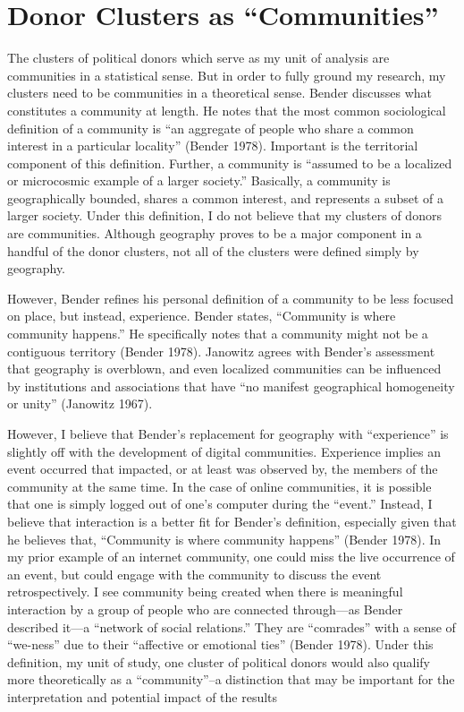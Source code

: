 \documentclass[12pt,]{article}
\begin{document}
\hypertarget{donor-clusters-as-communities}{%
\section{Donor Clusters as
``Communities''}\label{donor-clusters-as-communities}}

The clusters of political donors which serve as my unit of analysis are
communities in a statistical sense. But in order to fully ground my
research, my clusters need to be communities in a theoretical sense.
Bender discusses what constitutes a community at length. He notes that
the most common sociological definition of a community is ``an aggregate
of people who share a common interest in a particular locality'' (Bender
1978). Important is the territorial component of this definition.
Further, a community is ``assumed to be a localized or microcosmic
example of a larger society.'' Basically, a community is geographically
bounded, shares a common interest, and represents a subset of a larger
society. Under this definition, I do not believe that my clusters of
donors are communities. Although geography proves to be a major
component in a handful of the donor clusters, not all of the clusters
were defined simply by geography.

However, Bender refines his personal definition of a community to be
less focused on place, but instead, experience. Bender states,
``Community is where community happens.'' He specifically notes that a
community might not be a contiguous territory (Bender 1978). Janowitz
agrees with Bender's assessment that geography is overblown, and even
localized communities can be influenced by institutions and associations
that have ``no manifest geographical homogeneity or unity'' (Janowitz
1967).

However, I believe that Bender's replacement for geography with
``experience'' is slightly off with the development of digital
communities. Experience implies an event occurred that impacted, or at
least was observed by, the members of the community at the same time. In
the case of online communities, it is possible that one is simply logged
out of one's computer during the ``event.'' Instead, I believe that
interaction is a better fit for Bender's definition, especially given
that he believes that, ``Community is where community happens'' (Bender
1978). In my prior example of an internet community, one could miss the
live occurrence of an event, but could engage with the community to
discuss the event retrospectively. I see community being created when
there is meaningful interaction by a group of people who are connected
through---as Bender described it---a ``network of social relations.''
They are ``comrades'' with a sense of ``we-ness'' due to their
``affective or emotional ties'' (Bender 1978). Under this definition, my
unit of study, one cluster of political donors would also qualify more
theoretically as a ``community''--a distinction that may be important
for the interpretation and potential impact of the results
\end{document}
